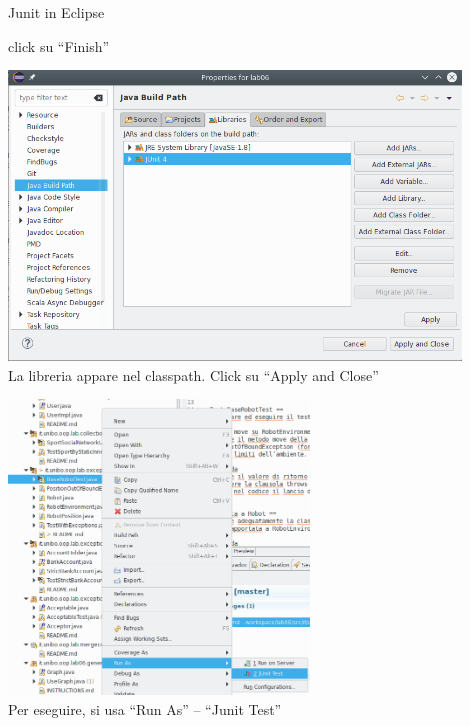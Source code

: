 \documentclass[presentation]{beamer}
\begin{document}
\begin{frame}[allowframebreaks]{Junit in Eclipse}
\begin{center}
    click su ``Finish''
  \end{center}
  \begin{center}
    \includegraphics[width=0.9\textwidth]{junit/e4}\\
    La libreria appare nel classpath. Click su ``Apply and Close''
  \end{center}
  \begin{center}
    \includegraphics[width=0.6\textwidth]{junit/run}\\
    Per eseguire, si usa ``Run As'' -- ``Junit Test''
  \end{center}
\end{frame}
\end{document}
